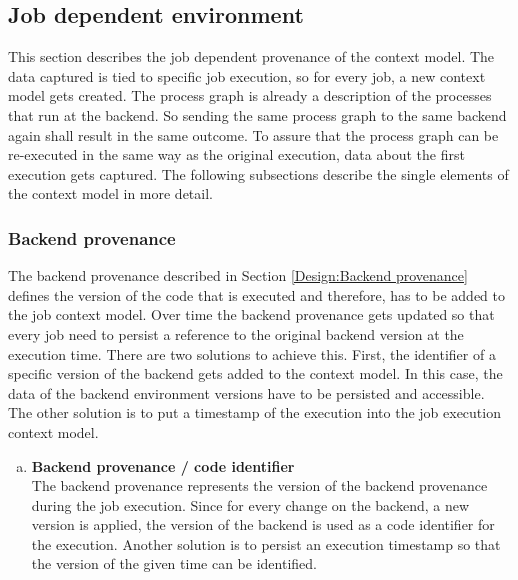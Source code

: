 \documentclass[draft,final]{vutinfth} %
\begin{document}
\subsection{Job dependent environment}\label{Design:Job dependent provenance}
This section describes the job dependent provenance of the context model. The data captured is tied to specific job execution, so for every job, a new context model gets created. The process graph is already a description of the processes that run at the backend. So sending the same process graph to the same backend again shall result in the same outcome. To assure that the process graph can be re-executed in the same way as the original execution, data about the first execution gets captured. 
The following subsections describe the single elements of the context model in more detail. 

\subsubsection{Backend provenance}\label{Job:Backend provenance}
The backend provenance described in Section \ref{Design:Backend provenance} defines the version of the code that is executed and therefore, has to be added to the job context model. Over time the backend provenance gets updated so that every job need to persist a reference to the original backend version at the execution time. There are two solutions to achieve this. First, the identifier of a specific version of the backend gets added to the context model. In this case, the data of the backend environment versions have to be persisted and accessible. The other solution is to put a timestamp of the execution into the job execution context model.

\begin{enumerate}[(b)]
	\item \textbf{Backend provenance / code identifier} \\
	The backend provenance represents the version of the backend provenance during the job execution. Since for every change on the backend, a new version is applied, the version of the backend is used as a code identifier for the execution. Another solution is to persist an execution timestamp so that the version of the given time can be identified.
\end{enumerate}
\end{document}
